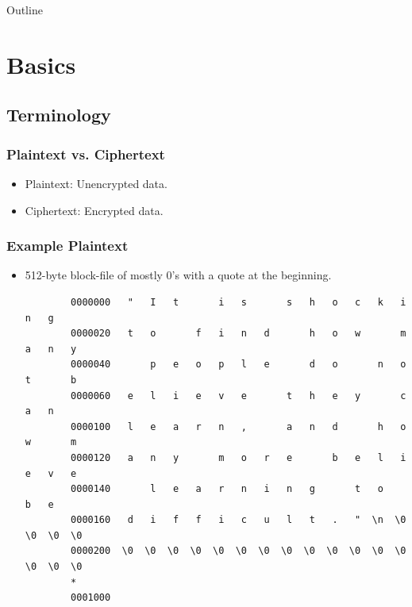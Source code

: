 \documentclass[xcolor={dvipsnames,svgnames},hyperref=dvips]{beamer}
\title[Full-Disk Encryption]{}
\author{Wade Cline}
\date{04 March 2014}
\begin{document}
\begin{frame}
  \titlepage
\end{frame}

\begin{frame}{Outline}
  \tableofcontents
\end{frame}

\section{Basics}\label{section:basics}
	\subsection{Terminology}
	\begin{frame}
		\frametitle{Plaintext vs. Ciphertext}
		\begin{itemize}
		\item Plaintext: Unencrypted data.
		\item Ciphertext: Encrypted data.
		\end{itemize}
	\end{frame}

	\begin{frame}[fragile]
		\frametitle{Example Plaintext}
		\begin{itemize}
		\item 512-byte block-file of mostly 0's with a quote at the beginning. \\
		\begin{lstlisting}
		0000000   "   I   t       i   s       s   h   o   c   k   i   n   g    
		0000020   t   o       f   i   n   d       h   o   w       m   a   n   y
		0000040       p   e   o   p   l   e       d   o       n   o   t       b
		0000060   e   l   i   e   v   e       t   h   e   y       c   a   n    
		0000100   l   e   a   r   n   ,       a   n   d       h   o   w       m
		0000120   a   n   y       m   o   r   e       b   e   l   i   e   v   e
		0000140       l   e   a   r   n   i   n   g       t   o       b   e    
		0000160   d   i   f   f   i   c   u   l   t   .   "  \n  \0  \0  \0  \0
		0000200  \0  \0  \0  \0  \0  \0  \0  \0  \0  \0  \0  \0  \0  \0  \0  \0
		*
		0001000
		\end{lstlisting}
		\end{itemize}
	\end{frame}
\end{document}

